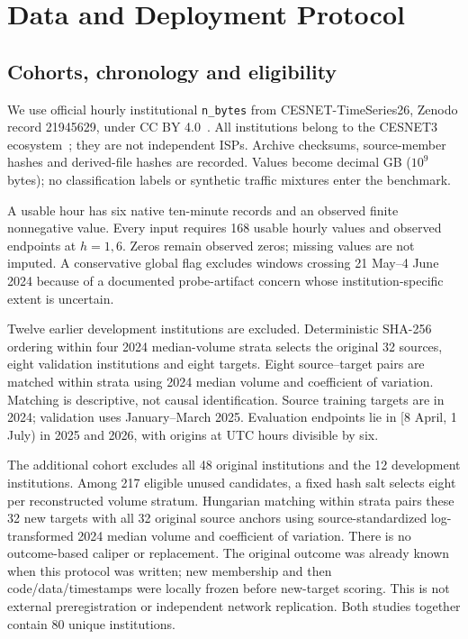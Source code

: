 \documentclass[conference]{IEEEtran}
\begin{document}
\section{Data and Deployment Protocol}
\subsection{Cohorts, chronology and eligibility}
We use official hourly institutional \texttt{n\_bytes} from CESNET-TimeSeries26, Zenodo record 21945629, under CC BY 4.0~\cite{dataset}. All institutions belong to the CESNET3 ecosystem~\cite{cesnet26}; they are not independent ISPs. Archive checksums, source-member hashes and derived-file hashes are recorded. Values become decimal GB ($10^9$ bytes); no classification labels or synthetic traffic mixtures enter the benchmark.

A usable hour has six native ten-minute records and an observed finite nonnegative value. Every input requires 168 usable hourly values and observed endpoints at $h=1,6$. Zeros remain observed zeros; missing values are not imputed. A conservative global flag excludes windows crossing 21 May--4 June 2024 because of a documented probe-artifact concern whose institution-specific extent is uncertain.

Twelve earlier development institutions are excluded. Deterministic SHA-256 ordering within four 2024 median-volume strata selects the original 32 sources, eight validation institutions and eight targets. Eight source--target pairs are matched within strata using 2024 median volume and coefficient of variation. Matching is descriptive, not causal identification. Source training targets are in 2024; validation uses January--March 2025. Evaluation endpoints lie in [8 April, 1 July) in 2025 and 2026, with origins at UTC hours divisible by six.

The additional cohort excludes all 48 original institutions and the 12 development institutions. Among 217 eligible unused candidates, a fixed hash salt selects eight per reconstructed volume stratum. Hungarian matching within strata pairs these 32 new targets with all 32 original source anchors using source-standardized log-transformed 2024 median volume and coefficient of variation. There is no outcome-based caliper or replacement. The original outcome was already known when this protocol was written; new membership and then code/data/timestamps were locally frozen before new-target scoring. This is not external preregistration or independent network replication. Both studies together contain 80 unique institutions.
\end{document}
